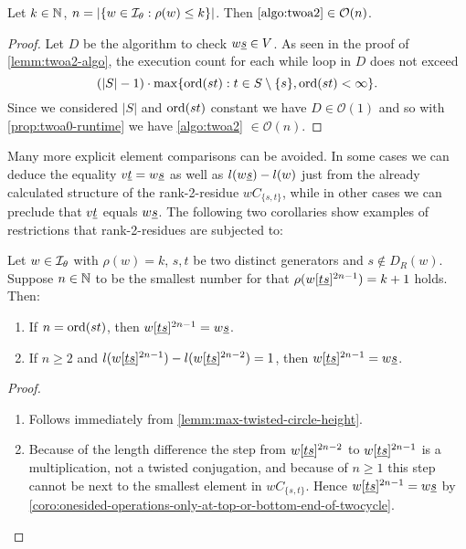 \begin{lemm}
	Let $k \in \mathbb{N}$, $n = |\{ w \in \mathcal{I}_{\theta} : \rho(w) \leq k \}|$. Then $\ref{algo:twoa2} \in \mathcal{O}(n)$.

	\begin{proof}
		Let $D$ be the algorithm to check $w \underline{s} \in V$. As seen in the proof of \ref{lemm:twoa2-algo}, the execution count for each while loop in $D$ does not exceed
		$$ (|S|-1) \cdot \max \{ \operatorname{ord}(st) : t \in S \setminus \{s\}, \operatorname{ord}(st) < \infty \}. $$
		Since we considered $|S|$ and $\operatorname{ord}(st)$ constant we have $D \in \mathcal{O}(1)$ and so with \ref{prop:twoa0-runtime} we have \ref{algo:twoa2} $\in \mathcal{O}(n)$. 
	\end{proof}
\end{lemm}

Many more explicit element comparisons can be avoided. In some cases we can deduce the equality $v \underline{t} = w \underline{s}$ as well as $l(w \underline{s}) - l(w)$ just from the already calculated structure of the rank-2-residue $wC_{\{s,t\}}$, while in other cases we can preclude that $v \underline{t}$ equals $w \underline{s}$. The following two corollaries show examples of restrictions that rank-2-residues are subjected to:

\begin{coro}
	Let $w \in \mathcal{I}_{\theta}$ with $\rho(w) = k$, $s,t$ be two distinct generators and $s \notin D_R(w)$. Suppose $n \in \mathbb{N}$ to be the smallest number for that $\rho(w[\underline{t} \underline{s}]^{2n-1}) = k + 1$ holds. Then:

	\begin{enumerate}
		\item If $n = \operatorname{ord}(st)$, then $w[\underline{t} \underline{s}]^{2n-1} = w \underline{s}$.
		\item If $n \geq 2$ and $l(w[\underline{t} \underline{s}]^{2n-1}) - l(w[\underline{t} \underline{s}]^{2n-2}) = 1$, then $w[\underline{t} \underline{s}]^{2n-1} = w \underline{s}$.
	\end{enumerate}

	\begin{proof}

		\begin{enumerate}
			\item Follows immediately from \ref{lemm:max-twisted-circle-height}.
			\item Because of the length difference the step from $w[\underline{t} \underline{s}]^{2n-2}$ to $w[\underline{t} \underline{s}]^{2n-1}$ is a multiplication, not a twisted conjugation, and because of $n \geq 1$ this step cannot be next to the smallest element in $wC_{\{s,t\}}$. Hence $w[\underline{t} \underline{s}]^{2n-1} = w \underline{s}$ by \ref{coro:onesided-operations-only-at-top-or-bottom-end-of-twocycle}. \qedhere
		\end{enumerate}
	\end{proof}
\end{coro}

